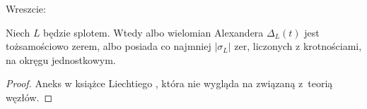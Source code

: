 Wreszcie:

\begin{proposition}
    Niech $L$ będzie splotem.
    Wtedy albo wielomian Alexandera $\Delta_L(t)$ jest tożsamościowo zerem, albo posiada co najmniej $|\sigma_L|$ zer, liczonych z krotnościami, na okręgu jednostkowym.
\end{proposition}

\begin{proof}
    Aneks w książce Liechtiego \cite{liechti2016}, która nie wygląda na związaną z~teorią węzłów.
\end{proof}

%


